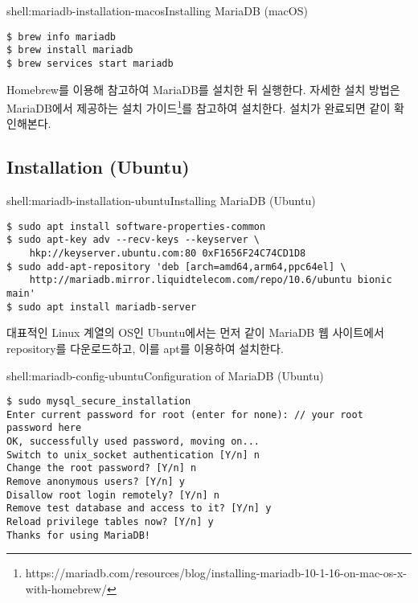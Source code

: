 \begin{shell}{shell:mariadb-installation-macos}{Installing MariaDB (macOS)}
\begin{verbatim}
$ brew info mariadb
$ brew install mariadb
$ brew services start mariadb
\end{verbatim}
\end{shell}

Homebrew를 이용해 \를 참고하여 MariaDB를 설치한 뒤 실행한다. 자세한 설치 방법은 MariaDB에서 제공하는 설치 가이드\footnote{https://mariadb.com/resources/blog/installing-mariadb-10-1-16-on-mac-os-x-with-homebrew/}를 참고하여 설치한다. 설치가 완료되면 \와 같이 확인해본다.

\subsection*{Installation (Ubuntu)}


\begin{shell}{shell:mariadb-installation-ubuntu}{Installing MariaDB (Ubuntu)}
\begin{verbatim}
$ sudo apt install software-properties-common
$ sudo apt-key adv --recv-keys --keyserver \
    hkp://keyserver.ubuntu.com:80 0xF1656F24C74CD1D8
$ sudo add-apt-repository 'deb [arch=amd64,arm64,ppc64el] \
    http://mariadb.mirror.liquidtelecom.com/repo/10.6/ubuntu bionic main'
$ sudo apt install mariadb-server
\end{verbatim}
\end{shell}

대표적인 Linux 계열의 OS인 Ubuntu에서는 먼저 \와 같이 MariaDB 웹 사이트에서 repository를 다운로드하고, 이를 apt를 이용하여 설치한다.

\begin{shell}{shell:mariadb-config-ubuntu}{Configuration of MariaDB (Ubuntu)}
\begin{verbatim}
$ sudo mysql_secure_installation
Enter current password for root (enter for none): // your root password here
OK, successfully used password, moving on...
Switch to unix_socket authentication [Y/n] n
Change the root password? [Y/n] n
Remove anonymous users? [Y/n] y
Disallow root login remotely? [Y/n] n
Remove test database and access to it? [Y/n] y
Reload privilege tables now? [Y/n] y
Thanks for using MariaDB!
\end{verbatim}
\end{shell}


